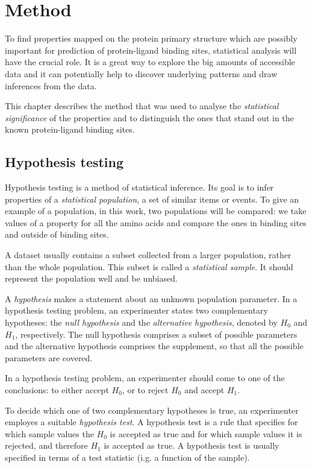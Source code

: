 
\chapter{Method}

To find properties mapped on the protein primary structure which are possibly important for prediction of protein-ligand binding sites, statistical analysis will have the crucial role. It is a great way to explore the big amounts of accessible data and it can potentially help to discover underlying patterns and draw inferences from the data.

This chapter describes the method that was used to analyse the \textit{statistical significance} of the properties and to distinguish the ones that stand out in the known protein-ligand binding sites.

\section{Hypothesis testing}

Hypothesis testing is a method of statistical inference. Its goal is to infer properties of a \textit{statistical population}, a set of similar items or events. To give an example of a population, in this work, two populations will be compared: we take values of a property for all the amino acids and compare the ones in binding sites and outside of binding sites.

A dataset usually contains a subset collected from a larger population, rather than the whole population. This subset is called a \textit{statistical sample}. It should represent the population well and be unbiased.

A \textit{hypothesis} makes a statement about an unknown population parameter. In a hypothesis testing problem, an experimenter states two complementary hypotheses: the \textit{null hypothesis} and the \textit{alternative hypothesis}, denoted by $H_{0}$ and $H_{1}$, respectively. The null hypothesis comprises a subset of possible parameters and the alternative hypothesis comprises the supplement, so that all the possible parameters are covered.

In a hypothesis testing problem, an experimenter should come to one of the conclusions: to either accept $H_{0}$, or to reject $H_{0}$ and accept $H_{1}$.

To decide which one of two complementary hypotheses is true, an experimenter employes a suitable \textit{hypothesis test}. A hypothesis test is a rule that specifies for which sample values the $H_{0}$ is accepted as true and for which sample values it is rejected, and therefore $H_{1}$ is accepted as true. A hypothesis test is usually specified in terms of a test statistic (i.g. a function of the sample). \cite{casella}

